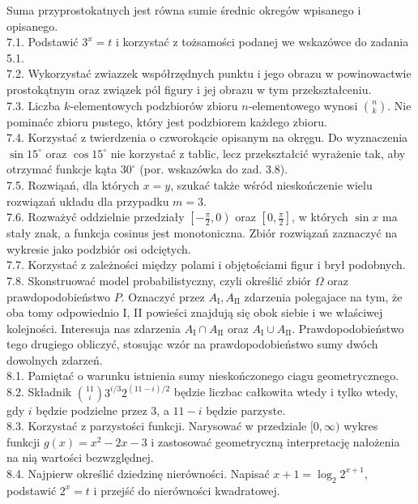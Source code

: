 \documentclass[10pt]{article}
\begin{document}
Suma przyprostokatnych jest równa sumie średnic okregów wpisanego i opisanego.\\
7.1. Podstawić $3^{x}=t$ i korzystać z tożsamości podanej we wskazówce do zadania 5.1.\\
7.2. Wykorzystać zwiazzek współrzędnych punktu i jego obrazu w powinowactwie prostokątnym oraz związek pól figury i jej obrazu w tym przekształceniu.\\
7.3. Liczba $k$-elementowych podzbiorów zbioru $n$-elementowego wynosi $\binom{n}{k}$. Nie pominaćc zbioru pustego, który jest podzbiorem każdego zbioru.\\
7.4. Korzystać z twierdzenia o czworokącie opisanym na okręgu. Do wyznaczenia $\sin 15^{\circ}$ oraz $\cos 15^{\circ}$ nie korzystać z tablic, lecz przekształcić wyrażenie tak, aby otrzymać funkcje kąta $30^{\circ}$ (por. wskazówka do zad. 3.8).\\
7.5. Rozwiąań, dla których $x=y$, szukać także wśród nieskończenie wielu rozwiązań układu dla przypadku $m=3$.\\
7.6. Rozważyć oddzielnie przedziały $\left[-\frac{\pi}{2}, 0\right)$ oraz $\left[0, \frac{\pi}{2}\right]$, w których $\sin x$ ma stały znak, a funkcja cosinus jest monotoniczna. Zbiór rozwiązań zaznaczyć na wykresie jako podzbiór osi odciętych.\\
7.7. Korzystać z zależności między polami i objętościami figur i brył podobnych.\\
7.8. Skonstruować model probabilistyczny, czyli określić zbiór $\Omega$ oraz prawdopodobieństwo $P$. Oznaczyć przez $A_{\mathrm{I}}, A_{\mathrm{II}}$ zdarzenia polegajace na tym, że oba tomy odpowiednio I, II powieści znajdują się obok siebie i we właściwej kolejności. Interesuja nas zdarzenia $A_{\mathrm{I}} \cap A_{\mathrm{II}}$ oraz $A_{\mathrm{I}} \cup A_{\mathrm{II}}$. Prawdopodobieństwo tego drugiego obliczyć, stosując wzór na prawdopodobieństwo sumy dwóch dowolnych zdarzeń.\\
8.1. Pamiętać o warunku istnienia sumy nieskończonego ciagu geometrycznego.\\
8.2. Składnik $\binom{11}{i} 3^{i / 3} 2^{(11-i) / 2}$ będzie liczbac całkowita wtedy i tylko wtedy, gdy $i$ będzie podzielne przez 3, a $11-i$ będzie parzyste.\\
8.3. Korzystać z parzystości funkcji. Narysować w przedziale $[0, \infty)$ wykres funkcji $g(x)=x^{2}-2 x-3$ i zastosować geometryczną interpretację nałożenia na nią wartości bezwzględnej.\\
8.4. Najpierw określić dziedzinę nierówności. Napisać $x+1=\log _{2} 2^{x+1}$, podstawić $2^{x}=t$ i przejść do nierówności kwadratowej.\\
\end{document}
